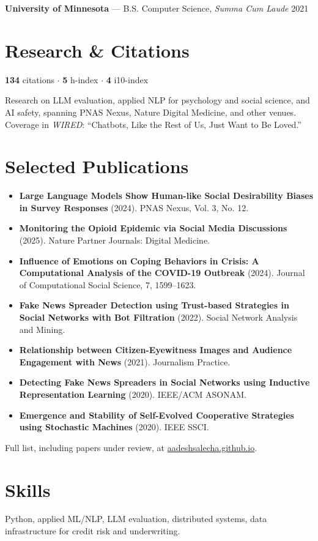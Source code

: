\documentclass[10.5pt]{article}
\begin{document}
\textbf{University of Minnesota} --- B.S. Computer Science, \textit{Summa Cum Laude} \hfill 2021

\section*{Research \& Citations}

\textbf{134} citations \quad $\cdot$ \quad \textbf{5} h-index \quad $\cdot$ \quad \textbf{4} i10-index 

Research on LLM evaluation, applied NLP for psychology and social science, and AI safety, spanning
PNAS Nexus, Nature Digital Medicine, and other venues. Coverage in \textit{WIRED}: ``Chatbots, Like
the Rest of Us, Just Want to Be Loved.''

\section*{Selected Publications}

\begin{itemize}[leftmargin=*, itemsep=0.15em]
  \item \textbf{Large Language Models Show Human-like Social Desirability Biases in Survey Responses} (2024). PNAS Nexus, Vol. 3, No. 12.
  \item \textbf{Monitoring the Opioid Epidemic via Social Media Discussions} (2025). Nature Partner Journals: Digital Medicine.
  \item \textbf{Influence of Emotions on Coping Behaviors in Crisis: A Computational Analysis of the COVID-19 Outbreak} (2024). Journal of Computational Social Science, 7, 1599--1623.
  \item \textbf{Fake News Spreader Detection using Trust-based Strategies in Social Networks with Bot Filtration} (2022). Social Network Analysis and Mining.
  \item \textbf{Relationship between Citizen-Eyewitness Images and Audience Engagement with News} (2021). Journalism Practice.
  \item \textbf{Detecting Fake News Spreaders in Social Networks using Inductive Representation Learning} (2020). IEEE/ACM ASONAM.
  \item \textbf{Emergence and Stability of Self-Evolved Cooperative Strategies using Stochastic Machines} (2020). IEEE SSCI.
\end{itemize}

{\small Full list, including papers under review, at \href{https://aadeshsalecha.github.io}{aadeshsalecha.github.io}.}

\section*{Skills}
Python, applied ML/NLP, LLM evaluation, distributed systems, data infrastructure for credit risk and underwriting.
\end{document}
